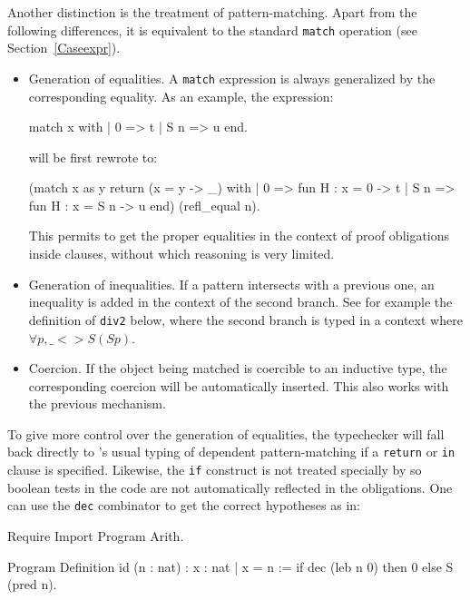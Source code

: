 Another distinction is the treatment of pattern-matching. Apart from the
following differences, it is equivalent to the standard {\tt match}
operation (see Section~\ref{Caseexpr}).
\begin{itemize}
\item Generation of equalities. A {\tt match} expression is always
  generalized by the corresponding equality. As an example,
  the expression: 

\begin{coq_example*}
  match x with
  | 0 => t
  | S n => u
  end.
\end{coq_example*}
will be first rewrote to:
\begin{coq_example*}
  (match x as y return (x = y -> _) with
  | 0 => fun H : x = 0 -> t
  | S n => fun H : x = S n -> u
  end) (refl_equal n).
\end{coq_example*}
  
  This permits to get the proper equalities in the context of proof
  obligations inside clauses, without which reasoning is very limited.

\item Generation of inequalities. If a pattern intersects with a
  previous one, an inequality is added in the context of the second
  branch. See for example the definition of {\tt div2} below, where the second
  branch is typed in a context where $\forall p, \_ <> S (S p)$.
  
\item Coercion. If the object being matched is coercible to an inductive
  type, the corresponding coercion will be automatically inserted. This also
  works with the previous mechanism.
\end{itemize}

To give more control over the generation of equalities, the typechecker will
fall back directly to \Coq's usual typing of dependent pattern-matching
if a {\tt return} or {\tt in} clause is specified. Likewise,
the {\tt if} construct is not treated specially by \Program{} so boolean
tests in the code are not automatically reflected in the obligations. 
One can use the {\tt dec} combinator to get the correct hypotheses as in:

\begin{coq_eval}
Require Import Program Arith.
\end{coq_eval}
\begin{coq_example}
Program Definition id (n : nat) : { x : nat | x = n } :=
  if dec (leb n 0) then 0
  else S (pred n).
\end{coq_example}

